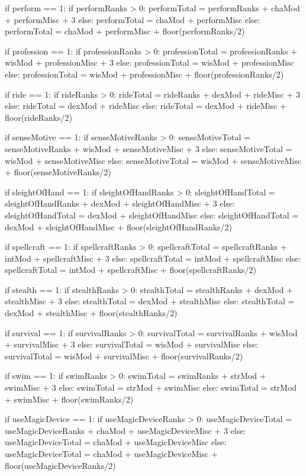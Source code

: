 \documentclass[10pt]{article}
\begin{document}
\begin{sagesilent}
if perform == 1:
	 if performRanks > 0:
	  performTotal = performRanks + chaMod + performMisc + 3
	 else:
	  performTotal = chaMod + performMisc
else:
	 performTotal = chaMod + performMisc + floor(performRanks/2)

if profession == 1:
	 if professionRanks > 0:
	  professionTotal = professionRanks + wisMod + professionMisc + 3
	 else:
	  professionTotal = wisMod + professionMisc
else:
	 professionTotal = wisMod + professionMisc + floor(professionRanks/2)

if ride == 1:
	 if rideRanks > 0:
	  rideTotal = rideRanks + dexMod + rideMisc + 3
	 else:
	  rideTotal = dexMod + rideMisc
else:
	 rideTotal = dexMod + rideMisc + floor(rideRanks/2)

if senseMotive == 1:
	 if senseMotiveRanks > 0:
	  senseMotiveTotal = senseMotiveRanks + wisMod + senseMotiveMisc + 3
	 else:
	  senseMotiveTotal = wisMod + senseMotiveMisc
else:
	 senseMotiveTotal = wisMod + senseMotiveMisc + floor(senseMotiveRanks/2)

if sleightOfHand == 1:
	 if sleightOfHandRanks > 0:
	  sleightOfHandTotal = sleightOfHandRanks + dexMod + sleightOfHandMisc + 3
	 else:
	  sleightOfHandTotal = dexMod + sleightOfHandMisc
else:
	 sleightOfHandTotal = dexMod + sleightOfHandMisc + floor(sleightOfHandRanks/2)

if spellcraft == 1:
	 if spellcraftRanks > 0:
	  spellcraftTotal = spellcraftRanks + intMod + spellcraftMisc + 3
	 else:
	  spellcraftTotal = intMod + spellcraftMisc
else:
	 spellcraftTotal = intMod + spellcraftMisc + floor(spellcraftRanks/2)

if stealth == 1:
	 if stealthRanks > 0:
	  stealthTotal = stealthRanks + dexMod + stealthMisc + 3
	 else:
	  stealthTotal = dexMod + stealthMisc
else:
	 stealthTotal = dexMod + stealthMisc + floor(stealthRanks/2)

if survival == 1:
	 if survivalRanks > 0:
	  survivalTotal = survivalRanks + wisMod + survivalMisc + 3
	 else:
	  survivalTotal = wisMod + survivalMisc
else:
	 survivalTotal = wisMod + survivalMisc + floor(survivalRanks/2)

if swim == 1:
	 if swimRanks > 0:
	  swimTotal = swimRanks + strMod + swimMisc + 3
	 else:
	  swimTotal = strMod + swimMisc
else:
	 swimTotal = strMod + swimMisc + floor(swimRanks/2)

if useMagicDevice == 1:
	 if useMagicDeviceRanks > 0:
	  useMagicDeviceTotal = useMagicDeviceRanks + chaMod + useMagicDeviceMisc + 3
	 else:
	  useMagicDeviceTotal = chaMod + useMagicDeviceMisc
else:
	 useMagicDeviceTotal = chaMod + useMagicDeviceMisc + floor(useMagicDeviceRanks/2)

\end{sagesilent}
\end{document}
